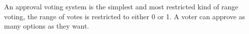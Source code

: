 An approval voting system is the simplest and most restricted kind of range
voting, the range of votes is restricted to either 0 or 1. A voter can approve
as many options as they want.

%
%

%
%
%
%

